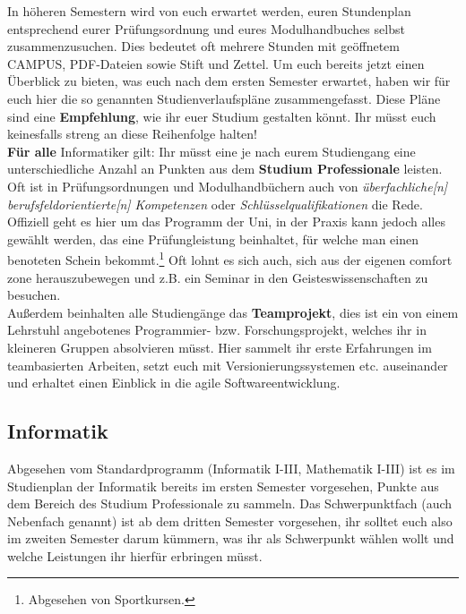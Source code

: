 In höheren Semestern wird von euch erwartet werden, euren Stundenplan entsprechend eurer Prüfungsordnung und eures Modulhandbuches selbst zusammenzusuchen.
Dies bedeutet oft mehrere Stunden mit geöffnetem CAMPUS, PDF-Dateien sowie Stift und Zettel. Um euch bereits jetzt einen Überblick zu bieten,
was euch nach dem ersten Semester erwartet, haben wir für euch hier die so genannten Studienverlaufspläne zusammengefasst. Diese Pläne sind eine \textbf{Empfehlung}, wie ihr euer Studium gestalten könnt. Ihr müsst euch keinesfalls streng an diese Reihenfolge halten! \medskip
\\
\textbf{Für alle} Informatiker gilt: Ihr müsst eine je nach eurem Studiengang eine unterschiedliche Anzahl an Punkten aus dem \textbf{Studium Professionale} leisten. Oft ist in Prüfungsordnungen und Modulhandbüchern auch von \emph{überfachliche[n] berufsfeldorientierte[n] Kompetenzen} oder \emph{Schlüsselqualifikationen} die Rede. Offiziell geht es hier um das Programm der Uni, in der Praxis kann jedoch alles gewählt werden, das eine Prüfungleistung beinhaltet, für welche man einen benoteten Schein bekommt.\footnote{Abgesehen von Sportkursen.} Oft lohnt es sich auch, sich aus der eigenen comfort zone herauszubewegen und z.B. ein Seminar in den Geisteswissenschaften zu besuchen. \\Außerdem beinhalten alle Studiengänge das \textbf{Teamprojekt}, dies ist ein von einem Lehrstuhl angebotenes Programmier- bzw. Forschungsprojekt, welches ihr in kleineren Gruppen absolvieren müsst. Hier sammelt ihr erste Erfahrungen im teambasierten Arbeiten, setzt euch mit Versionierungssystemen etc. auseinander und erhaltet einen Einblick in die agile Softwareentwicklung.
\vfill \pagebreak 
\subsection*{Informatik}
	
Abgesehen vom Standardprogramm (Informatik I-III, Mathematik I-III) ist es im Studienplan der Informatik bereits im ersten Semester vorgesehen, Punkte aus dem Bereich des Studium Professionale zu sammeln.  Das Schwerpunktfach (auch Nebenfach genannt) ist ab dem dritten Semester vorgesehen, ihr solltet euch also im zweiten Semester darum kümmern, was ihr als Schwerpunkt wählen wollt und welche Leistungen ihr hierfür erbringen müsst.

